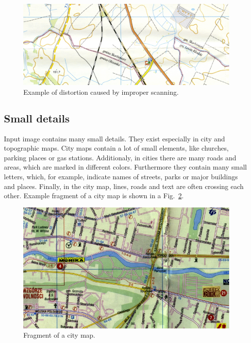 \documentclass[a4paper,onecolumn,oneside,12pt]{memoir}
\begin{document}
\begin{figure}[!ht]
\begin{center}
\includegraphics[scale=1.3]{images/badScanExample.jpg}
\caption{Example of distortion caused by improper scanning.}
\label{badScanExample}
\end{center}
\end{figure}

\subsection{Small details}

Input image contains many small details. They exist especially in city and topographic maps.
City maps contain a lot of small elements, like churches, parking places or gas stations.
Additionaly, in cities there are many roads and areas, which are marked in different colors. 
Furthermore they contain many small letters, which, for example, indicate names of streets, parks
or major buildings and places. Finally, in the city map, lines, roads and text are often crossing
each other. Example fragment of a city map is shown in a Fig.~\ref{cityExample}.

\begin{figure}[!ht]
\begin{center}
\includegraphics[scale=0.65]{images/cityExample.jpg}
\caption{Fragment of a city map.}
\label{cityExample}
\end{center}
\end{figure}
\end{document}
